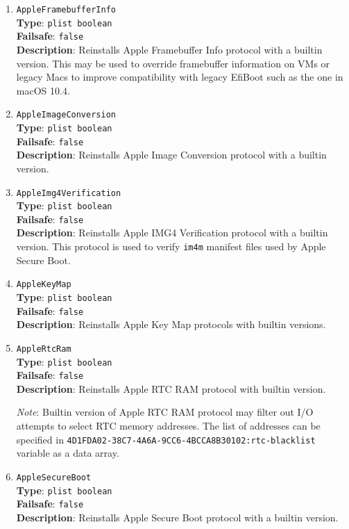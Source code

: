 \documentclass[]{article}
\begin{document}
\begin{enumerate}
\item
  \texttt{AppleFramebufferInfo}\\
  \textbf{Type}: \texttt{plist\ boolean}\\
  \textbf{Failsafe}: \texttt{false}\\
  \textbf{Description}: Reinstalls Apple Framebuffer Info protocol with a builtin
  version. This may be used to override framebuffer information on VMs or legacy Macs
  to improve compatibility with legacy EfiBoot such as the one in macOS 10.4.

\item
  \texttt{AppleImageConversion}\\
  \textbf{Type}: \texttt{plist\ boolean}\\
  \textbf{Failsafe}: \texttt{false}\\
  \textbf{Description}: Reinstalls Apple Image Conversion protocol with a builtin
  version.

\item
  \texttt{AppleImg4Verification}\\
  \textbf{Type}: \texttt{plist\ boolean}\\
  \textbf{Failsafe}: \texttt{false}\\
  \textbf{Description}: Reinstalls Apple IMG4 Verification protocol with a builtin
  version. This protocol is used to verify \texttt{im4m} manifest files used by
  Apple Secure Boot.

\item
  \texttt{AppleKeyMap}\\
  \textbf{Type}: \texttt{plist\ boolean}\\
  \textbf{Failsafe}: \texttt{false}\\
  \textbf{Description}: Reinstalls Apple Key Map protocols with builtin
  versions.

\item
  \texttt{AppleRtcRam}\\
  \textbf{Type}: \texttt{plist\ boolean}\\
  \textbf{Failsafe}: \texttt{false}\\
  \textbf{Description}: Reinstalls Apple RTC RAM protocol with builtin
  version.

  \emph{Note}: Builtin version of Apple RTC RAM protocol may filter out
  I/O attempts to select RTC memory addresses. The list of addresses
  can be specified in \texttt{4D1FDA02-38C7-4A6A-9CC6-4BCCA8B30102:rtc-blacklist}
  variable as a data array.

\item
  \texttt{AppleSecureBoot}\\
  \textbf{Type}: \texttt{plist\ boolean}\\
  \textbf{Failsafe}: \texttt{false}\\
  \textbf{Description}: Reinstalls Apple Secure Boot protocol with a builtin
  version.


\end{enumerate}
\end{document}
